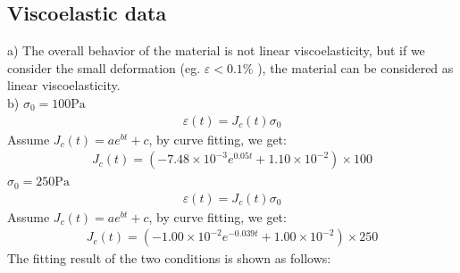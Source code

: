 \documentclass{elsarticle}
\begin{document}
\subsection{Viscoelastic data}
a)
The overall behavior of the material is not linear viscoelasticity, but if we consider the small deformation (eg. $\varepsilon < 0.1\%$ ), the material can be considered as linear viscoelasticity.\\
b)
$\sigma_0=100 \text{Pa}$
\begin{align*}
    \varepsilon(t)=J_c(t)\sigma_0
\end{align*}
Assume $J_c(t)=ae^{bt}+c$, by curve fitting, we get:
\begin{align*}
    J_c(t) = (-7.48\times10^{-3}e^{0.05t}+1.10\times10^{-2})\times100
\end{align*}
$\sigma_0=250 \text{Pa}$
\begin{align*}
    \varepsilon(t)=J_c(t)\sigma_0
\end{align*}
Assume $J_c(t)=ae^{bt}+c$, by curve fitting, we get:
\begin{align*}
    J_c(t) = (-1.00\times10^{-2}e^{-0.039t}+1.00\times10^{-2})\times250
\end{align*}
The fitting result of the two conditions is shown as follows:
\end{document}
